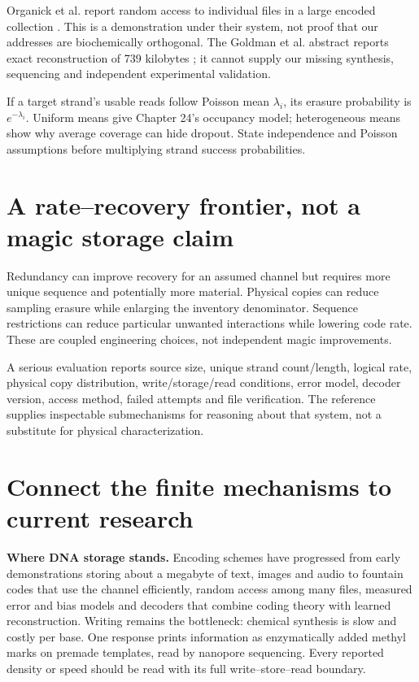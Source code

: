 Organick et al. report random access to individual files in a large
encoded collection \cite{Organick2018}. This is a demonstration under
their system, not proof that our addresses are biochemically orthogonal.
The Goldman et al. abstract reports exact reconstruction of
739 kilobytes \cite{Goldman2013}; it cannot supply our missing synthesis,
sequencing and independent experimental validation.

If a target strand's usable reads follow Poisson mean $\lambda_i$,
its erasure probability is $e^{-\lambda_i}$.
Uniform means give Chapter 24's occupancy model; heterogeneous means
show why average coverage can hide dropout. State independence and
Poisson assumptions before multiplying strand success probabilities.

\section{A rate--recovery frontier, not a magic storage claim}

Redundancy can improve recovery for an assumed channel but requires more unique
sequence and potentially more material. Physical copies can reduce sampling
erasure while enlarging the inventory denominator. Sequence restrictions can
reduce particular unwanted interactions while lowering code rate. These
are coupled engineering choices, not independent magic improvements.

A serious evaluation reports source size, unique strand count/length,
logical rate, physical copy distribution, write/storage/read conditions,
error model, decoder version, access method, failed attempts and file verification.
The reference supplies inspectable submechanisms for reasoning about that
system, not a substitute for physical characterization.

\section{Connect the finite mechanisms to current research}
\begin{Frontier}
\textbf{Where DNA storage stands.} Encoding schemes have progressed from early
demonstrations storing about a megabyte of text, images and
audio\cite{Church2012,Goldman2013} to fountain codes that use the channel
efficiently,\cite{ErlichZielinski2017} random access among
many files,\cite{Organick2018} measured error and bias models\cite{Chen2020bias,Gimpel2023}
and decoders that combine coding theory with learned
reconstruction.\cite{BarLev2025} Writing remains the bottleneck: chemical
synthesis is slow and costly per base.\cite{Kosuri2014} One response prints
information as enzymatically added methyl marks on premade templates, read by
nanopore sequencing.\cite{ZhangC2024} Every reported density or speed should be
read with its full write--store--read boundary.
\end{Frontier}

